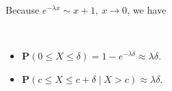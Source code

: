 Because $e^{-\lambda x} \sim x + 1, ~x \to 0$, we have
\begin{property} ~
    \begin{itemize} 
        \item $\mathbf{P}(0 \leq X \leq \delta) = 1 - e^{-\lambda \delta} \approx \lambda \delta$.
        \item $\mathbf{P}(c \leq X \leq c + \delta \mid X > c) \approx \lambda \delta$.
    \end{itemize}
\end{property}

